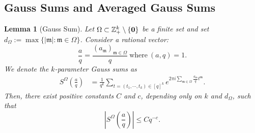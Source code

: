 \documentclass[10pt,a4paper]{amsart}
\newtheorem{lemma}{Lemma}\numberwithin{lemma}{section}
\numberwithin{equation}{section}
\begin{document}
 


\subsection{Gauss Sums and Averaged Gauss Sums}
\begin{lemma}[Gauss Sum] \label{el22} 
Let $\Omega\subset \mathbb{Z}_+^k \setminus \{{\bf 0}\}$ be a finite set and set  $d_{\Omega}:=\max\{|\mathfrak{m}|:\mathfrak{m}\in \Omega\}$. Consider a rational vector: 
   $$
  \frac{a}{q}=\frac{(a_{\mathfrak{m}})_{\mathfrak{m}\in \Omega}}{q}  \ \text{where}  \ (a,q)=1.$$ 
   We denote the $k$-parameter  Gauss sums as 
 \begin{align*} 
 S^{\Omega}\left(\frac{a}{q}\right)& = \frac{1}{q^k}\sum_{t= (t_1,\cdots,t_k)\in [q]^k}e^{2\pi i \sum_{\mathfrak{m}\in\Omega } \frac{a_{\mathfrak{m}}}{q} t^{\mathfrak{m}}}.  
\end{align*}
 Then, there exist positive constants $C$ and $c$, depending only on $k$ and $d_{\Omega}$, such that
\begin{equation}\label{g2}
\left|S^{\Omega}\!\left(\frac{a}{q}\right)\right|
\le C q^{-c}.
\end{equation}
\end{lemma}

 
 
\end{document}
